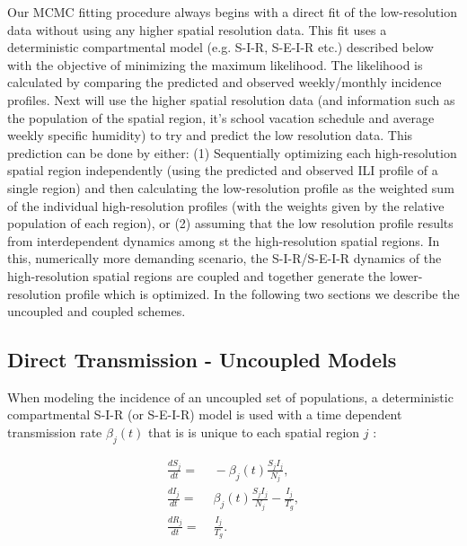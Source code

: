 \documentclass[a4paper]{article}
\begin{document}
Our MCMC fitting procedure always begins with a direct fit of the low-resolution data without using any higher spatial resolution data. This fit uses a deterministic compartmental model (e.g. S-I-R, S-E-I-R etc.) described below with the objective of minimizing the maximum likelihood.  The likelihood is calculated by comparing the predicted and observed weekly/monthly incidence profiles.  Next  will use the higher spatial resolution data (and information such as the population of the spatial region, it's school vacation schedule and average weekly specific humidity) to try and predict the low resolution data.  This prediction can be done by either: (1)  Sequentially optimizing each high-resolution spatial region independently (using the predicted and observed ILI profile of a single region) and then calculating the low-resolution profile as the weighted sum of the individual high-resolution profiles (with the weights given by the relative population of each region), or (2) assuming that the low resolution profile results from interdependent dynamics among st the high-resolution spatial regions.  In this, numerically more demanding scenario, the S-I-R/S-E-I-R dynamics of the high-resolution spatial regions are coupled and together generate the lower-resolution profile which is optimized.  In the following two sections we describe the uncoupled and coupled schemes.

\subsection{Direct Transmission - Uncoupled Models}
\label{sec:single}

When modeling the incidence of an uncoupled set of populations, a deterministic compartmental S-I-R (or S-E-I-R) model is used with a time dependent transmission rate $\beta_j(t)$ that is is unique to each spatial region $j$ \cite{keeling08a}:

\begin{align}
\frac{dS_j}{dt} =&\; - \beta_j(t)\frac{S_j I_j}{N_{j}}, \label{eq:eqSIR1} \\
\frac{dI_j}{dt} =&\;  \beta_j(t)\frac{ S_j I_j}{N_{j}} - \frac{I_j}{T_g},  \label{eq:eqSIR2} \\
\frac{dR_j}{dt} =&\; \frac{I_j}{T_g}. \label{eq:eqSIR3}
\end{align}
\end{document}
